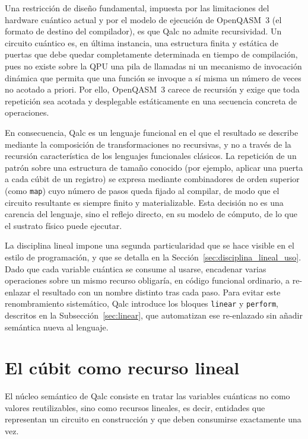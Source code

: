 Una restricción de diseño fundamental, impuesta por las limitaciones del hardware cuántico actual y por el modelo de ejecución de OpenQASM~3 (el formato de destino del compilador), es que Qalc no admite recursividad. Un circuito cuántico es, en última instancia, una estructura finita y estática de puertas que debe quedar completamente determinada en tiempo de compilación, pues no existe sobre la QPU una pila de llamadas ni un mecanismo de invocación dinámica que permita que una función se invoque a sí misma un número de veces no acotado a priori. Por ello, OpenQASM~3 carece de recursión y exige que toda repetición sea acotada y desplegable estáticamente en una secuencia concreta de operaciones.

En consecuencia, Qalc es un lenguaje funcional en el que el resultado se describe mediante la composición de transformaciones no recursivas, y no a través de la recursión característica de los lenguajes funcionales clásicos. La repetición de un patrón sobre una estructura de tamaño conocido (por ejemplo, aplicar una puerta a cada cúbit de un registro) se expresa mediante combinadores de orden superior (como \lstinline|map|) cuyo número de pasos queda fijado al compilar, de modo que el circuito resultante es siempre finito y materializable. Esta decisión no es una carencia del lenguaje, sino el reflejo directo, en su modelo de cómputo, de lo que el sustrato físico puede ejecutar.

La disciplina lineal impone una segunda particularidad que se hace visible en el estilo de programación, y que se detalla en la Sección~\ref{sec:disciplina_lineal_uso}. Dado que cada variable cuántica se consume al usarse, encadenar varias operaciones sobre un mismo recurso obligaría, en código funcional ordinario, a re-enlazar el resultado con un nombre distinto tras cada paso. Para evitar este renombramiento sistemático, Qalc introduce los bloques \lstinline|linear| y \lstinline|perform|, descritos en la Subsección~\ref{sec:linear}, que automatizan ese re-enlazado sin añadir semántica nueva al lenguaje.

\section{El cúbit como recurso lineal}
\label{sec:modelo-lineal}

El núcleo semántico de Qalc consiste en tratar las variables cuánticas no como valores reutilizables, sino como recursos lineales, es decir, entidades que representan un circuito en construcción y que deben consumirse exactamente una vez.

